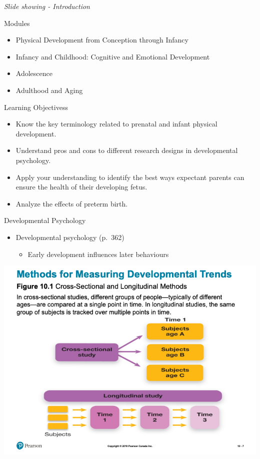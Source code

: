 \documentclass[
]{book}
\providecommand{\tightlist}{%
  \setlength{\itemsep}{0pt}\setlength{\parskip}{0pt}}
\begin{document}
\emph{Slide showing - Introduction}

Modules

\begin{itemize}
\tightlist
\item
  Physical Development from Conception through Infancy
\item
  Infancy and Childhood: Cognitive and Emotional Development
\item
  Adolescence
\item
  Adulthood and Aging
\end{itemize}

Learning Objectivess

\begin{itemize}
\tightlist
\item
  Know the key terminology related to prenatal and infant physical development.
\item
  Understand pros and cons to different research designs in developmental psychology.
\item
  Apply your understanding to identify the best ways expectant parents can ensure the health of their developing fetus.
\item
  Analyze the effects of preterm birth.
\end{itemize}

Developmental Psychology

\begin{itemize}
\tightlist
\item
  Developmental psychology (p.~362)

  \begin{itemize}
  \tightlist
  \item
    Early development influences later behaviours
  \end{itemize}
\end{itemize}

\includegraphics{assets/unit_3/slide_7.png}
\end{document}

